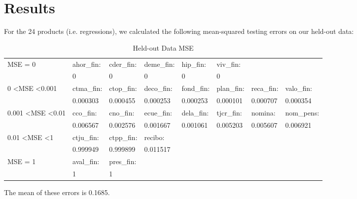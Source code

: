 \documentclass{report}
\begin{document}
\section{Results}

For the 24 products (i.e. regressions), we calculated the following mean-squared testing errors on our held-out data:

\begin{table}\footnotesize
\centering
\caption{Held-out Data MSE}
\label{my-label}
\begin{tabular}{llllllll}
MSE = 0                            & ahor\_fin:  & cder\_fin: & deme\_fin: & hip\_fin:  & viv\_fin:  &                     &            \\
                                     & 0                    & 0          & 0          & 0          & 0          &                     &            \\
0 \textless MSE \textless 0.001      & ctma\_fin:          & ctop\_fin: & deco\_fin: & fond\_fin: & plan\_fin: & reca\_fin:  & valo\_fin: \\
                                     & 0.000303            & 0.000455   & 0.000253   & 0.000253   & 0.000101   &  0.000707             & 0.000354   \\
0.001 \textless MSE \textless 0.01 & cco\_fin:           & cno\_fin:  & ecue\_fin: & dela\_fin: & tjcr\_fin: & nomina:             & nom\_pens: \\
                                     & 0.006567            & 0.002576   & 0.001667   & 0.001061   & 0.005203   & 0.005607            & 0.006921   \\
0.01 \textless MSE \textless 1     & ctju\_fin:          & ctpp\_fin: & recibo:    &            &            &                     &            \\
                                     & 0.999949            & 0.999899   & 0.011517   &            &            &                     &            \\
MSE = 1                            & aval\_fin:          & pres\_fin: &            &            &            &                     &            \\
                                     & 1                   & 1          &            &            &            &                     &           
\end{tabular}
\end{table}

The mean of these errors is 0.1685.
\end{document}
